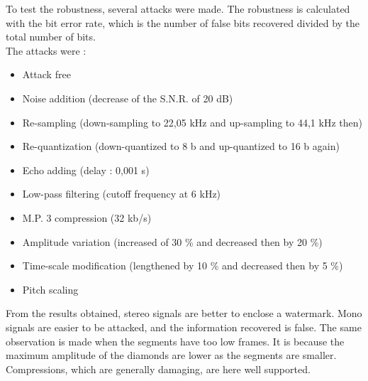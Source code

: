 To test the robustness, several attacks were made. The robustness is calculated with the bit error rate, which is the number of false bits recovered divided by the total number of bits.\\
The attacks were :
\begin{itemize}
\item Attack free
\item Noise addition (decrease of the S.N.R. of 20 dB)
\item Re-sampling (down-sampling to 22,05 kHz and up-sampling to 44,1 kHz then)
\item Re-quantization (down-quantized to 8 b and up-quantized to 16 b again)
\item Echo adding (delay : 0,001 s)
\item Low-pass filtering (cutoff frequency at 6 kHz)
\item M.P. 3 compression (32 kb/s)
\item Amplitude variation (increased of 30 \% and decreased then by 20 \%)
\item Time-scale modification (lengthened by 10 \% and decreased then by 5 \%)
\item Pitch scaling
\end{itemize}

From the results obtained, stereo signals are better to enclose a watermark. Mono signals are easier to be attacked, and the information recovered is false. The same observation is made when the segments have too low frames. It is because the maximum amplitude of the diamonds are lower as the segments are smaller.\\
Compressions, which are generally damaging, are here well supported.